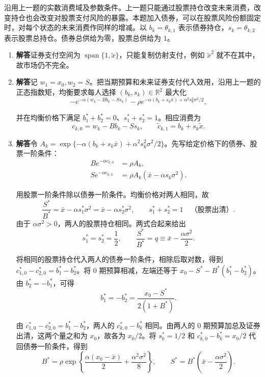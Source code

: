 \begin{solution}[blank-type=manual,blank-vsep=12\baselineskip]
沿用上一题的实数消费域及参数条件。上一题只能通过股票持仓改变未来消费，改变持仓也会改变对股票支付风险的暴露。本题加入债券，可以在股票风险份额固定时，对每个状态的未来消费作同样的增减。以 $b_k=\theta_{k,1}$ 表示债券持仓，$s_k=\theta_{k,2}$ 表示股票总持仓。债券总供给为零，股票总供给为 $1$。
\begin{enumerate}[label=(\alph*)]
\item \textbf{解答}\quad 证券支付空间为 $\operatorname{span}\{1,\widetilde x\}$，只能复制仿射支付，例如 $\widetilde x^2$ 就不在其中，故市场仍不完全。
\item \textbf{解答}\quad 记 $w_1=x_0,w_2=S$。把当期预算和未来证券支付代入效用，沿用上一题的正态指数矩，均衡要求每人选择 $(b_k,s_k)\in\mathbb R^2$ 最大化
\[
 -e^{-\alpha(w_k-Bb_k-Ss_k)}
 -\rho e^{-\alpha(b_k+s_k\bar x)+\alpha^2s_k^2\sigma^2/2},
\]

并在均衡价格下满足 $b_1^*+b_2^*=0$、$s_1^*+s_2^*=1$。相应消费为
\[
 c_{k,0}=w_k-Bb_k-Ss_k,\qquad
 \widetilde c_{k,1}=b_k+s_k\widetilde x.
\]

\item \textbf{解答}\quad 令 $A_k=\exp\{-\alpha(b_k+s_k\bar x)+\alpha^2s_k^2\sigma^2/2\}$。先写给定价格下的债券、股票一阶条件：
\begin{align*}
 B e^{-\alpha c_{k,0}}&=\rho A_k,
 \\
 S e^{-\alpha c_{k,0}}&=\rho A_k(\bar x-\alpha s_k\sigma^2).
\end{align*}

用股票一阶条件除以债券一阶条件。均衡价格对两人相同，故
 \[
 \frac{S^*}{B^*}=\bar x-\alpha s_1^*\sigma^2
                 =\bar x-\alpha s_2^*\sigma^2,
 \qquad s_1^*+s_2^*=1\quad\text{（股票出清）}.
 \]
由于 $\alpha\sigma^2>0$，两人的股票持仓相同。两式合起来给出
\[
 s_1^*=s_2^*=\frac12,\qquad
 \frac{S^*}{B^*}=q\equiv\bar x-\frac{\alpha\sigma^2}{2}.
\]

将相同的股票持仓代入两人的债券一阶条件，相除后取对数，得到 $c_{1,0}^*-c_{2,0}^*=b_1^*-b_2^*$。将 0 期预算相减，左端还等于 $x_0-S^*-B^*(b_1^*-b_2^*)$。由 $b_2^*=-b_1^*$，可得
\[
 b_1^*=-b_2^*=\frac{x_0-S^*}{2(1+B^*)}.
\]

由 $c_{1,0}^*-c_{2,0}^*=b_1^*-b_2^*$，两人的 $c_{k,0}^*-b_k^*$ 相同。由两人的 0 期预算加总及证券出清，这两个量之和为 $x_0$，故各为 $x_0/2$。将 $s_k^*=1/2$ 和 $c_{k,0}^*-b_k^*=x_0/2$ 代回债券一阶条件，得到
\[
 \boxed{B^*=\rho\exp\left\{
 \frac{\alpha(x_0-\bar x)}2+\frac{\alpha^2\sigma^2}{8}\right\},
 \qquad S^*=B^*\left(\bar x-\frac{\alpha\sigma^2}{2}\right)}.
\]


\end{enumerate}
\end{solution}
